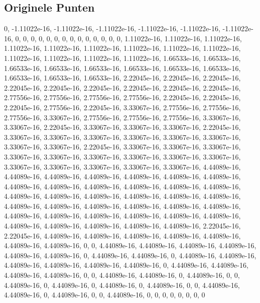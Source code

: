 \documentclass[10pt,a4paper,twocolumn]{article}
\begin{document}
\subsection{Originele Punten}
0, -1.11022e-16, -1.11022e-16, -1.11022e-16, -1.11022e-16, -1.11022e-16, -1.11022e-16, 0, 0, 0, 0, 0, 0, 0, 0, 0, 0, 0, 0, 0, 0, 1.11022e-16, 1.11022e-16, 1.11022e-16, 1.11022e-16, 1.11022e-16, 1.11022e-16, 1.11022e-16, 1.11022e-16, 1.11022e-16, 1.11022e-16, 1.11022e-16, 1.11022e-16, 1.11022e-16, 1.66533e-16, 1.66533e-16, 1.66533e-16, 1.66533e-16, 1.66533e-16, 1.66533e-16, 1.66533e-16, 1.66533e-16, 1.66533e-16, 1.66533e-16, 1.66533e-16, 2.22045e-16, 2.22045e-16, 2.22045e-16, 2.22045e-16, 2.22045e-16, 2.22045e-16, 2.22045e-16, 2.22045e-16, 2.22045e-16, 2.77556e-16, 2.77556e-16, 2.77556e-16, 2.77556e-16, 2.22045e-16, 2.22045e-16, 2.22045e-16, 2.77556e-16, 2.22045e-16, 3.33067e-16, 2.77556e-16, 2.77556e-16, 2.77556e-16, 3.33067e-16, 2.77556e-16, 2.77556e-16, 2.77556e-16, 3.33067e-16, 3.33067e-16, 2.22045e-16, 3.33067e-16, 3.33067e-16, 3.33067e-16, 2.22045e-16, 3.33067e-16, 3.33067e-16, 3.33067e-16, 3.33067e-16, 3.33067e-16, 3.33067e-16, 3.33067e-16, 3.33067e-16, 2.22045e-16, 3.33067e-16, 3.33067e-16, 3.33067e-16, 3.33067e-16, 3.33067e-16, 3.33067e-16, 3.33067e-16, 3.33067e-16, 3.33067e-16, 3.33067e-16, 3.33067e-16, 3.33067e-16, 3.33067e-16, 3.33067e-16, 4.44089e-16, 4.44089e-16, 4.44089e-16, 4.44089e-16, 4.44089e-16, 4.44089e-16, 4.44089e-16, 4.44089e-16, 4.44089e-16, 4.44089e-16, 4.44089e-16, 4.44089e-16, 4.44089e-16, 4.44089e-16, 4.44089e-16, 4.44089e-16, 4.44089e-16, 4.44089e-16, 4.44089e-16, 4.44089e-16, 4.44089e-16, 4.44089e-16, 4.44089e-16, 4.44089e-16, 4.44089e-16, 4.44089e-16, 4.44089e-16, 4.44089e-16, 4.44089e-16, 4.44089e-16, 4.44089e-16, 4.44089e-16, 4.44089e-16, 4.44089e-16, 4.44089e-16, 4.44089e-16, 2.22045e-16, 2.22045e-16, 4.44089e-16, 4.44089e-16, 4.44089e-16, 4.44089e-16, 4.44089e-16, 4.44089e-16, 4.44089e-16, 0, 0, 4.44089e-16, 4.44089e-16, 4.44089e-16, 4.44089e-16, 4.44089e-16, 4.44089e-16, 0, 4.44089e-16, 4.44089e-16, 0, 4.44089e-16, 4.44089e-16, 4.44089e-16, 4.44089e-16, 4.44089e-16, 4.44089e-16, 0, 4.44089e-16, 4.44089e-16, 4.44089e-16, 4.44089e-16, 0, 0, 4.44089e-16, 4.44089e-16, 0, 4.44089e-16, 0, 0, 4.44089e-16, 0, 4.44089e-16, 0, 4.44089e-16, 0, 4.44089e-16, 0, 0, 4.44089e-16, 4.44089e-16, 0, 4.44089e-16, 0, 0, 4.44089e-16, 0, 0, 0, 0, 0, 0, 0, 0
\end{document}
